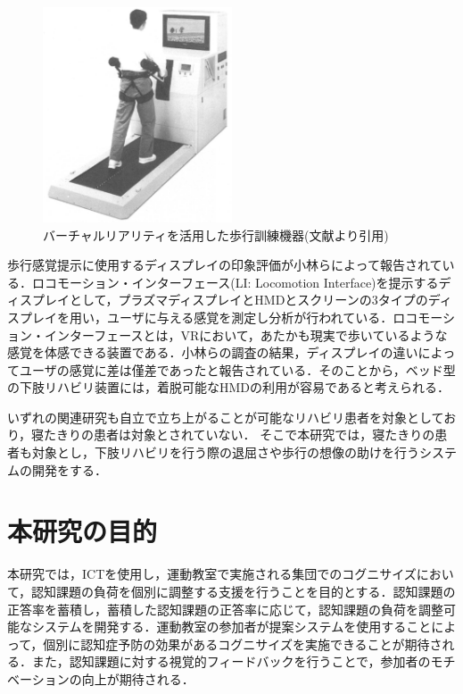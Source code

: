 \begin{figure}[tbp]
	\centering
			\includegraphics[width=0.5\textwidth]{chap1-figure/VRhokou.eps}
	\caption{バーチャルリアリティを活用した歩行訓練機器(文献\cite{日立}より引用)}
	\label{fig:hitachi}
\end{figure}

歩行感覚提示に使用するディスプレイの印象評価\cite{ディスプレイの違い}が小林らによって報告されている．ロコモーション・インターフェース\cite{ロコモーション}(LI: Locomotion Interface)を提示するディスプレイとして，プラズマディスプレイとHMDとスクリーンの3タイプのディスプレイを用い，ユーザに与える感覚を測定し分析が行われている．ロコモーション・インターフェースとは，VRにおいて，あたかも現実で歩いているような感覚を体感できる装置である．小林らの調査の結果，ディスプレイの違いによってユーザの感覚に差は僅差であったと報告されている．そのことから，ベッド型の下肢リハビリ装置には，着脱可能なHMDの利用が容易であると考えられる．

いずれの関連研究も自立で立ち上がることが可能なリハビリ患者を対象としており，寝たきりの患者は対象とされていない．
そこで本研究では，寝たきりの患者も対象とし，下肢リハビリを行う際の退屈さや歩行の想像の助けを行うシステムの開発をする．
\fi

\section{本研究の目的}
本研究では，ICTを使用し，運動教室で実施される集団でのコグニサイズにおいて，認知課題の負荷を個別に調整する支援を行うことを目的とする．認知課題の正答率を蓄積し，蓄積した認知課題の正答率に応じて，認知課題の負荷を調整可能なシステムを開発する．運動教室の参加者が提案システムを使用することによって，個別に認知症予防の効果があるコグニサイズを実施できることが期待される．また，認知課題に対する視覚的フィードバックを行うことで，参加者のモチベーションの向上が期待される．

